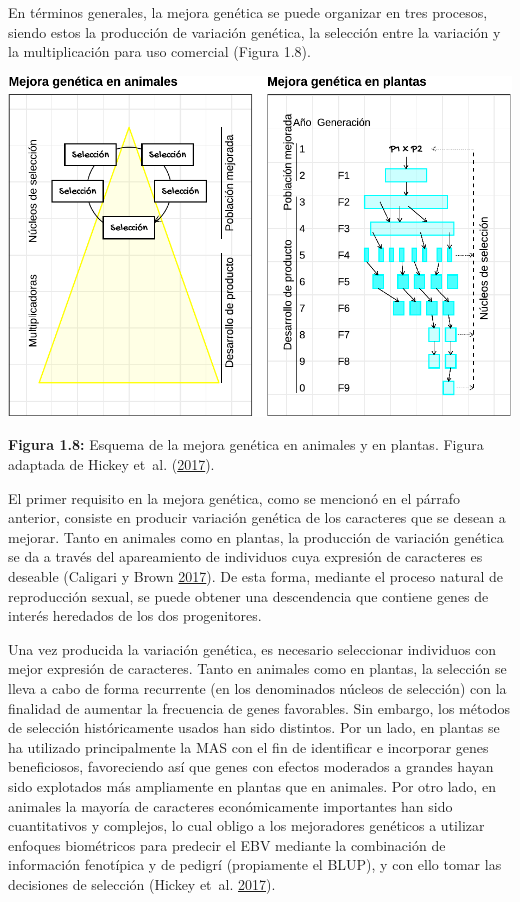 \documentclass[11pt,spanish,a4paper,oneside,]{book} %
\begin{document}
En términos generales, la mejora genética se puede organizar en tres procesos, siendo estos la producción de variación genética, la selección entre la variación y la multiplicación para uso comercial (Figura 1.8).

\begin{center}\includegraphics[width=1\linewidth]{figures/Mej_Anim_Plan} \end{center}

\begin{center}
\textbf{Figura 1.8:} Esquema de la mejora genética en animales y en plantas. Figura adaptada de Hickey et~al. (\protect\hyperlink{ref-cite:44}{2017}).

\end{center}

El primer requisito en la mejora genética, como se mencionó en el párrafo anterior, consiste en producir variación genética de los caracteres que se desean a mejorar. Tanto en animales como en plantas, la producción de variación genética se da a través del apareamiento de individuos cuya expresión de caracteres es deseable (Caligari y Brown \protect\hyperlink{ref-cite:42}{2017}). De esta forma, mediante el proceso natural de reproducción sexual, se puede obtener una descendencia que contiene genes de interés heredados de los dos progenitores.

Una vez producida la variación genética, es necesario seleccionar individuos con mejor expresión de caracteres. Tanto en animales como en plantas, la selección se lleva a cabo de forma recurrente (en los denominados núcleos de selección) con la finalidad de aumentar la frecuencia de genes favorables. Sin embargo, los métodos de selección históricamente usados han sido distintos. Por un lado, en plantas se ha utilizado principalmente la MAS con el fin de identificar e incorporar genes beneficiosos, favoreciendo así que genes con efectos moderados a grandes hayan sido explotados más ampliamente en plantas que en animales. Por otro lado, en animales la mayoría de caracteres económicamente importantes han sido cuantitativos y complejos, lo cual obligo a los mejoradores genéticos a utilizar enfoques biométricos para predecir el EBV mediante la combinación de información fenotípica y de pedigrí (propiamente el BLUP), y con ello tomar las decisiones de selección (Hickey et~al. \protect\hyperlink{ref-cite:44}{2017}).
\end{document}
